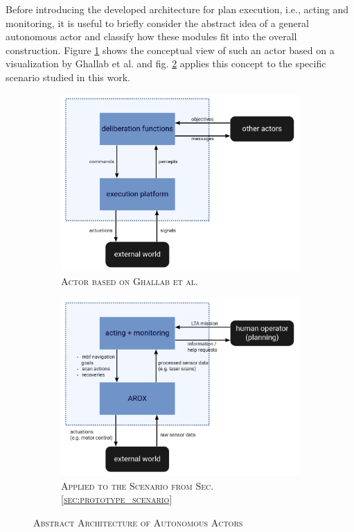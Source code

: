\documentclass[english, master, utf8]{base/thesis_KBS}
\begin{document}
Before introducing the developed architecture for plan execution, i.e., acting and monitoring, it is useful to briefly consider the abstract idea of a general autonomous actor and
classify how these modules fit into the overall construction. Figure \ref{fig:GNT_actor} shows the conceptual view of such an actor based on a visualization by Ghallab et al.
and fig. \ref{fig:MSC_actor} applies this concept to the specific scenario studied in this work.
\begin{figure}[H]
    \centering
    \begin{subfigure}[b]{0.49\textwidth}
        \centering
        \includegraphics[width=\textwidth]{pics/GNT_actor_new.png}
        \caption{\textsc{Actor based on Ghallab et al. \cite{GNT:2016}}}
        \label{fig:GNT_actor}
    \end{subfigure}
    \hfill
    \begin{subfigure}[b]{0.49\textwidth}
        \centering
        \includegraphics[width=\textwidth]{pics/MSC_actor_new.png}
        \caption{\textsc{Applied to the Scenario from Sec. \ref{sec:prototype_scenario}}}
        \label{fig:MSC_actor}
    \end{subfigure}
\caption{\textsc{Abstract Architecture of Autonomous Actors}}
\label{fig:abstract_actor}
\end{figure}
\end{document}
